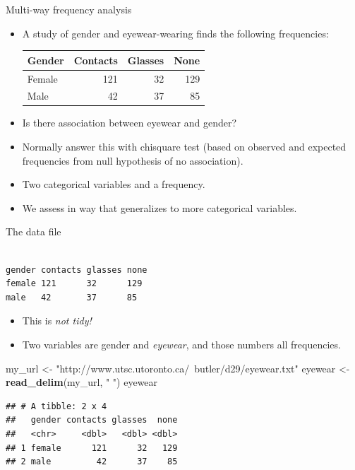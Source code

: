\documentclass[ignorenonframetext,]{beamer}
\newenvironment{Shaded}{\begin{snugshade}}{\end{snugshade}}
\newcommand{\KeywordTok}[1]{\textcolor[rgb]{0.13,0.29,0.53}{\textbf{#1}}}
\newcommand{\NormalTok}[1]{#1}
\newcommand{\StringTok}[1]{\textcolor[rgb]{0.31,0.60,0.02}{#1}}
\begin{document}
\begin{frame}{Multi-way frequency analysis}
\protect\hypertarget{multi-way-frequency-analysis}{}

\begin{itemize}
\item
  A study of gender and eyewear-wearing finds the following frequencies:

  \begin{tabular}{lrrr}
  \hline
  Gender & Contacts & Glasses & None \\
  \hline
  Female & 121 & 32 & 129 \\
  Male & 42 & 37 & 85\\
  \hline
  \end{tabular}
\item
  Is there association between eyewear and gender?
\item
  Normally answer this with chisquare test (based on observed and
  expected frequencies from null hypothesis of no association).
\item
  Two categorical variables and a frequency.
\item
  We assess in way that generalizes to more categorical variables.
\end{itemize}

\end{frame}

\begin{frame}[fragile]{The data file}
\protect\hypertarget{the-data-file}{}

\begin{verbatim}

gender contacts glasses none
female 121      32      129
male   42       37      85
\end{verbatim}

\begin{itemize}
\item
  This is \emph{not tidy!}
\item
  Two variables are gender and \emph{eyewear}, and those numbers all
  frequencies.
\end{itemize}

\begin{Shaded}
\begin{Highlighting}[]
\NormalTok{my_url <-}\StringTok{ "http://www.utsc.utoronto.ca/~butler/d29/eyewear.txt"}
\NormalTok{eyewear <-}\StringTok{ }\KeywordTok{read_delim}\NormalTok{(my_url, }\StringTok{" "}\NormalTok{)}
\NormalTok{eyewear}
\end{Highlighting}
\end{Shaded}

\begin{verbatim}
## # A tibble: 2 x 4
##   gender contacts glasses  none
##   <chr>     <dbl>   <dbl> <dbl>
## 1 female      121      32   129
## 2 male         42      37    85
\end{verbatim}

\end{frame}
\end{document}

